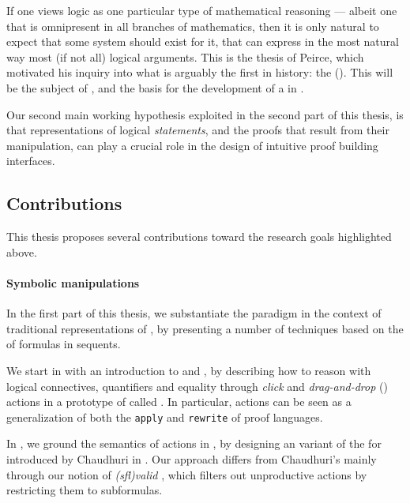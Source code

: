 \AP
If one views logic as one particular type of mathematical reasoning --- albeit
one that is omnipresent in all branches of mathematics, then it is only natural
to expect that some  system should exist for it, that can
express in the most natural way most (if not all) logical arguments. This is the
\emph{} thesis of Peirce, which motivated his inquiry into what is
arguably the first   in history: the
 (). This will be the subject of
, and the basis for the development of a \emph{}
 in .

\begin{emphpar}
  Our second main working hypothesis exploited in the second part of this
  thesis, is that  representations of logical \emph{statements}, and the
  proofs that result from their manipulation, can play a crucial role in the
  design of intuitive proof building interfaces.
\end{emphpar}

\subsection{Contributions}

This thesis proposes several contributions toward the research goals highlighted
above.

\paragraph{Symbolic manipulations}
  
In the first part of this thesis, we substantiate the  paradigm in the
context of traditional representations of , by presenting a number of
techniques based on the  of \emph{} formulas in
sequents.

\AP
We start in  with an introduction to  and , by
describing how to reason with logical connectives, quantifiers and equality
through \emph{click} and \emph{drag-and-drop} () actions in a
prototype of  called . In particular,  actions can
be seen as a generalization of both the \texttt{apply} and \texttt{rewrite}
 of  proof languages.

In , we ground the semantics of  actions in  , by designing an  variant of the
 for  introduced by Chaudhuri in \cite{Chaudhuri2013}.
Our approach differs from Chaudhuri's mainly through our notion of
\emph{\kl(sfl){valid} }, which filters out unproductive 
actions by restricting them to \emph{} subformulas.


